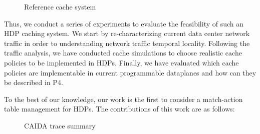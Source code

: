 \begin{figure}[]
	\centering
	
	\caption{Reference cache system}
	\label{fig:high_level_network}
\end{figure}


Thus, we conduct a series of experiments to evaluate the feasibility of such an HDP caching system.
We start by re-characterizing current data center network traffic in order to understanding network traffic temporal locality.
Following the traffic analysis, we have conducted cache simulations to choose realistic cache policies to be implemented in HDPs.
Finally, we have evaluated which cache policies are implementable in current programmable dataplanes and how can they be described in P4.

To the best of our knowledge, our work is the first to consider a match-action  table management for HDPs.
The contributions of this work are as follows: 

\begin{figure}[]
	\centering
	\caption{CAIDA trace summary}
	\label{fig:traces}
\end{figure}

